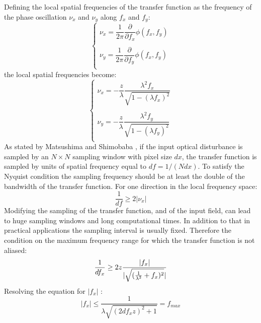  \newpage
 Defining the local spatial frequencies of the transfer function \cite{goodman2005introduction,matsushima2009band} as the frequency of the phase oscillation $\nu_x$ and $\nu_y$ along $f_x$ and $f_y$:
 \begin{equation}
 	\label{eq:BL3}
 	\begin{cases} \nu_x=\dfrac{1}{2\pi}\dfrac{\partial}{\partial f_x}\phi(f_x,f_y)\\
 	\\
 	 \nu_y=\dfrac{1}{2\pi}\dfrac{\partial}{\partial f_y}\phi(f_x,f_y)\\ \end{cases}
 \end{equation}
 the local spatial frequencies become:
 \begin{equation}
 \label{eq:BL16}
 \begin{cases} \nu_x=-\dfrac{z}{\lambda}\dfrac{\lambda^2 f_x}{\sqrt{1-(\lambda f_x)^2}}\\
 \\
 \nu_y=-\dfrac{z}{\lambda}\dfrac{\lambda^2 f_y}{\sqrt{1-(\lambda f_y)^2}}\\ \end{cases}
 \end{equation}
 As stated by Matsushima and Shimobaba \cite{matsushima2009band}, if the input optical disturbance is sampled by an $N \times N$ sampling window with pixel size $dx$, the transfer function is sampled by units of spatial frequency equal to $df=1/(N dx)$. To satisfy the Nyquist condition the sampling frequency should be at least the double of the bandwidth of the transfer function. For one direction in the local frequency space:
 \begin{equation}
 \label{eq:BL4}
 \dfrac{1}{df}\geq 2|\nu_x|
 \end{equation}
 Modifying the sampling of the transfer function, and of the input field, can lead to huge sampling windows and long computational times. In addition to that in practical applications the sampling interval is usually fixed. Therefore the condition on the maximum frequency range for which the transfer function is not aliased:
 \begin{equation}
 \label{eq:BL5}
 \dfrac{1}{df_x}\geq 2 z\dfrac{|f_x|}{|\sqrt{(\frac{1}{\lambda^2}+f_x)^2}|}\\ 
 \end{equation}
 Resolving the equation for $|f_x|$ :
 \begin{equation}
 \label{eq:BL6}
 |f_x|\leq\dfrac{1}{\lambda\sqrt{(2df_x z)^2+1}} = f_{max}
 \end{equation}
